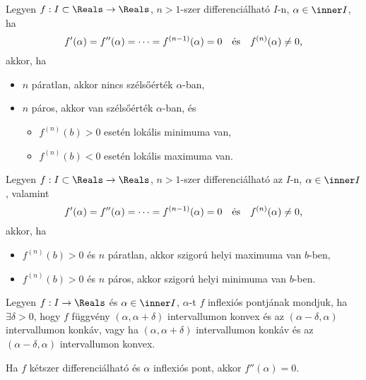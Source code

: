 \begin{theorem}
  Legyen $f: I\subset \Reals \rightarrow \Reals $, $n>1$-szer differenciálható
  $I$-n, $\alpha \in \inner I $, ha
  \[
    f'(\alpha)=f''(\alpha)=\dots =f^{(n-1)}
    (\alpha)=0
    \quad \text{és}\quad
    f^{(n)}(\alpha)\neq 0
    \text,
  \]
  akkor, ha
  \begin{itemize}
    \item $n$ páratlan, akkor nincs szélsőérték $\alpha$-ban,
    \item $n$ páros, akkor van szélsőérték $\alpha$-ban, és
          \begin{itemize}
            \item $f^{(n)}(b)>0$ esetén lokális minimuma van,
            \item $f^{(n)}(b)<0$ esetén lokális maximuma van.
          \end{itemize}
  \end{itemize}
\end{theorem}

\begin{theorem}
  Legyen $f: I\subset \Reals \rightarrow \Reals $, $n>1$-szer differenciálható
  az $I$-n, $\alpha \in \inner I $, valamint
  \[
    f'(\alpha)=f''(\alpha)=\dots =f^{(n-1)}
    (\alpha)=0
    \quad \text{és}\quad
    f^{(n)}(\alpha)\neq 0
    \text,
  \]
  akkor, ha
  \begin{itemize}
    \item $f^{(n)}(b)>0$ és $n$ páratlan, akkor szigorú helyi maximuma van
          $b$-ben,
    \item $f^{(n)}(b)>0$ és $n$ páros, akkor szigorú helyi minimuma van
          $b$-ben.
  \end{itemize}
\end{theorem}

\begin{definition}
  Legyen $f : I \rightarrow \Reals $ és $\alpha \in \inner I$, $\alpha$-t $f$
  inflexiós pontjának mondjuk, ha $\exists \delta >0$, hogy $f$ függvény
  $(\alpha,\alpha+ \delta)$ intervallumon konvex és az $(\alpha - \delta,
    \alpha)$ intervallumon konkáv, vagy ha  $(\alpha,\alpha+ \delta)$
  intervallumon konkáv és az $(\alpha - \delta,\alpha)$ intervallumon konvex.
\end{definition}

\begin{note}
  Ha $f$ kétszer differenciálható és $\alpha$ inflexiós pont, akkor
  $f''(\alpha)=0$.
\end{note}

